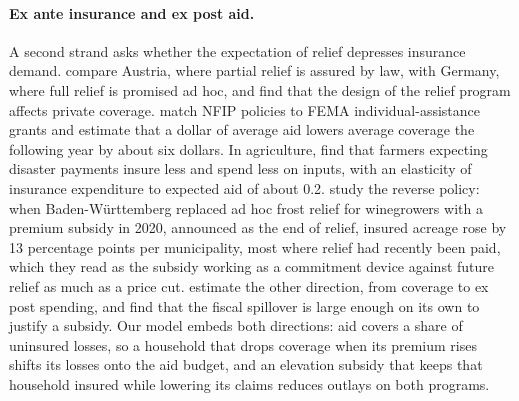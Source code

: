 \paragraph{Ex ante insurance and ex post aid.}
A second strand asks whether the expectation of relief depresses insurance demand. \citet{raschky2013} compare Austria, where partial relief is assured by law, with Germany, where full relief is promised ad hoc, and find that the design of the relief program affects private coverage. \citet{kouskyetal2018} match NFIP policies to FEMA individual-assistance grants and estimate that a dollar of average aid lowers average coverage the following year by about six dollars. In agriculture, \citet{deryuginakirwan2018} find that farmers expecting disaster payments insure less and spend less on inputs, with an elasticity of insurance expenditure to expected aid of about 0.2. \citet{philippischiller2024} study the reverse policy: when Baden-W\"urttemberg replaced ad hoc frost relief for winegrowers with a premium subsidy in 2020, announced as the end of relief, insured acreage rose by 13 percentage points per municipality, most where relief had recently been paid, which they read as the subsidy working as a commitment device against future relief as much as a price cut. \citet{grubersolomon2026} estimate the other direction, from coverage to ex post spending, and find that the fiscal spillover is large enough on its own to justify a subsidy. Our model embeds both directions: aid covers a share of uninsured losses, so a household that drops coverage when its premium rises shifts its losses onto the aid budget, and an elevation subsidy that keeps that household insured while lowering its claims reduces outlays on both programs.

